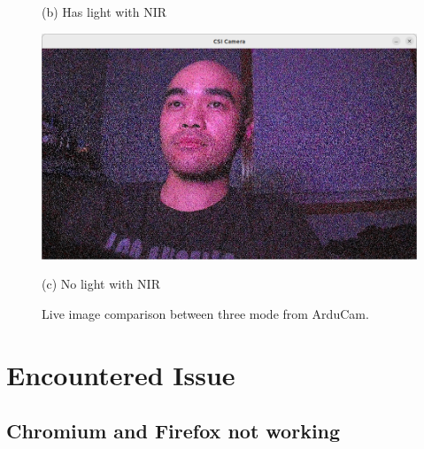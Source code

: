 \documentclass[12pt,hidelinks]{article}
\begin{document}
\begin{figure}[h]
\begin{minipage}{0.32\textwidth}
                \caption*{(b) Has light with NIR}
            \end{minipage}\hfill
            \begin{minipage}{0.32\textwidth}
            \centering
            \includegraphics[width=\linewidth]{pics/dark.png}
            \caption*{(c) No light with NIR}
            \end{minipage}
    
            \caption{Live image comparison between three mode from ArduCam.}
            \label{fig:three_mode_image}
        \end{figure}

        
        
        

\newpage

\section{Encountered Issue}
\label{sec:issue}
\vspace{10.5cm}


    \subsection{Chromium and Firefox not working}
    \label{subsec:issue_chromium_firefox}
\end{document}
